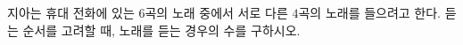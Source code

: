 \hspace*{2mm}\begin{minipage}[t]{\dimexpr\linewidth-2mm\relax}\vspace{0pt}
지아는 휴대 전화에 있는 $6$곡의 노래 중에서 서로 다른 $4$곡의 노래를 들으려고 한다. 듣는 순서를 고려할 때, 노래를 듣는 경우의 수를 구하시오.\end{minipage}
